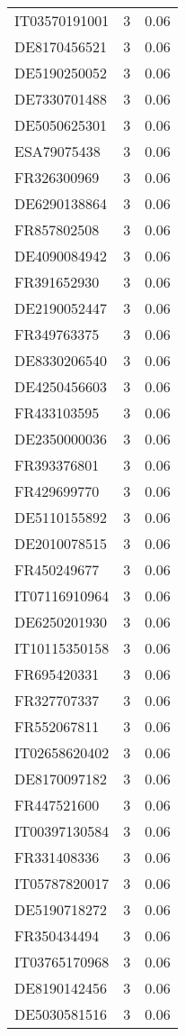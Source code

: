 \begin{table*}[htbp]
\begin{tabular}{lrr}
IT03570191001 & 3 & 0.06 \\
DE8170456521 & 3 & 0.06 \\
DE5190250052 & 3 & 0.06 \\
DE7330701488 & 3 & 0.06 \\
DE5050625301 & 3 & 0.06 \\
ESA79075438 & 3 & 0.06 \\
FR326300969 & 3 & 0.06 \\
DE6290138864 & 3 & 0.06 \\
FR857802508 & 3 & 0.06 \\
DE4090084942 & 3 & 0.06 \\
FR391652930 & 3 & 0.06 \\
DE2190052447 & 3 & 0.06 \\
FR349763375 & 3 & 0.06 \\
DE8330206540 & 3 & 0.06 \\
DE4250456603 & 3 & 0.06 \\
FR433103595 & 3 & 0.06 \\
DE2350000036 & 3 & 0.06 \\
FR393376801 & 3 & 0.06 \\
FR429699770 & 3 & 0.06 \\
DE5110155892 & 3 & 0.06 \\
DE2010078515 & 3 & 0.06 \\
FR450249677 & 3 & 0.06 \\
IT07116910964 & 3 & 0.06 \\
DE6250201930 & 3 & 0.06 \\
IT10115350158 & 3 & 0.06 \\
FR695420331 & 3 & 0.06 \\
FR327707337 & 3 & 0.06 \\
FR552067811 & 3 & 0.06 \\
IT02658620402 & 3 & 0.06 \\
DE8170097182 & 3 & 0.06 \\
FR447521600 & 3 & 0.06 \\
IT00397130584 & 3 & 0.06 \\
FR331408336 & 3 & 0.06 \\
IT05787820017 & 3 & 0.06 \\
DE5190718272 & 3 & 0.06 \\
FR350434494 & 3 & 0.06 \\
IT03765170968 & 3 & 0.06 \\
DE8190142456 & 3 & 0.06 \\
DE5030581516 & 3 & 0.06 \\

\end{tabular}
\end{table*}
